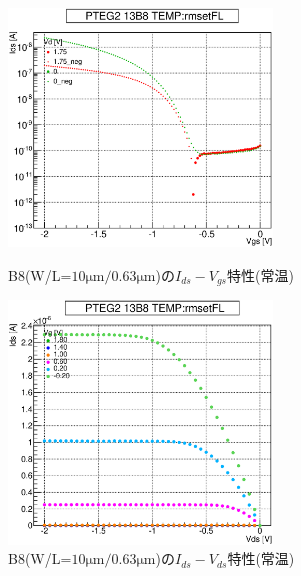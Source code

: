 				\begin{figure}[htbp]
					\begin{minipage}{0.5\hsize}
						\begin{center}
							\includegraphics[width=70mm]{./Chapter/Appendix/Picture/PBT/B8/PTEG2_13_B8_IdVg_rmsetFL.eps}
						\end{center}
						\caption{B8(W/L=$10\mathrm{\mu m}/0.63\mathrm{\mu m}$)の$I_{ds}-V_{gs}$特性(常温)}
						\label{fig:B8_IdVg_room}
					\end{minipage}
					\begin{minipage}{0.5\hsize}
						\begin{center}
							\includegraphics[width=70mm]{./Chapter/Appendix/Picture/PBT/B8/PTEG2_13_B8_IdVd_rmsetFL.eps}
						\end{center}
						\caption{B8(W/L=$10\mathrm{\mu m}/0.63\mathrm{\mu m}$)の$I_{ds}-V_{ds}$特性(常温)}
						\label{fig:B8_IdVd_room}
					\end{minipage}
				\end{figure}
				\clearpage
